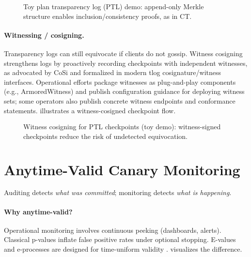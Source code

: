 \documentclass[11pt]{article}
\begin{document}
\begin{figure}[t]
  \centering
  \caption{Toy plan transparency log (PTL) demo: append-only Merkle structure enables inclusion/consistency proofs, as in CT.}
  \label{fig:ptl}
\end{figure}

\paragraph{Witnessing / cosigning.}
Transparency logs can still equivocate if clients do not gossip.
Witness cosigning strengthens logs by proactively recording checkpoints with independent witnesses, as advocated by CoSi \cite{sytaCoSi2016} and formalized in modern tlog cosignature/witness interfaces.\cite{c2spTlogCosignature,c2spTlogWitness}
Operational efforts package witnesses as plug-and-play components (e.g., ArmoredWitness) and publish configuration guidance for deploying witness sets; some operators also publish concrete witness endpoints and conformance statements.\cite{armoredWitnessGithub,trustfabricWitnesses2025}
 illustrates a witness-cosigned checkpoint flow.

\begin{figure}[t]
  \centering
  \caption{Witness cosigning for PTL checkpoints (toy demo): witness-signed checkpoints reduce the risk of undetected equivocation.}
  \label{fig:witness}
\end{figure}

\section{Anytime-Valid Canary Monitoring}
Auditing detects \emph{what was committed}; monitoring detects \emph{what is happening}.

\paragraph{Why anytime-valid?}
Operational monitoring involves continuous peeking (dashboards, alerts).
Classical p-values inflate false positive rates under optional stopping.
E-values and e-processes are designed for time-uniform validity \cite{ramdasSAVIStatSci2023,shaferTestingByBetting,ramdasEvaluesEbook2025}.
 visualizes the difference.
\end{document}
